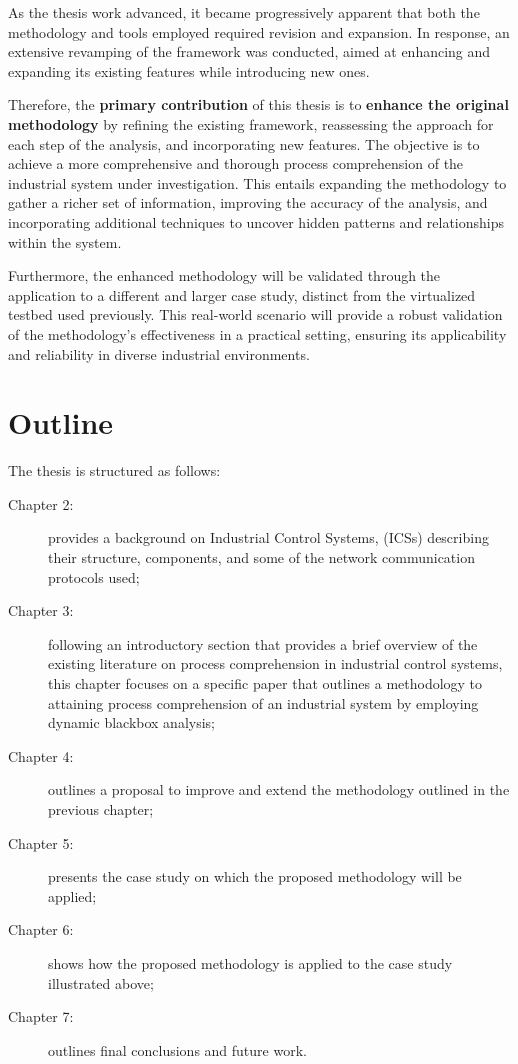 As the thesis work advanced, it became progressively apparent that both the methodology and tools employed required revision and expansion. In response, an extensive revamping of the framework was conducted, aimed at enhancing and expanding its existing features while introducing new ones.

\bigskip
Therefore, the \textbf{primary contribution} of this thesis is to \textbf{enhance the original methodology} by refining the existing framework, reassessing the approach for each step of the analysis, and incorporating new features. The objective is to achieve a more comprehensive and thorough process comprehension of the industrial system under investigation. This entails expanding the methodology to gather a richer set of information, improving the accuracy of the analysis, and incorporating additional techniques to uncover hidden patterns and relationships within the system.

\bigskip
Furthermore, the enhanced methodology will be validated through the application to a different and larger case study, distinct from the virtualized testbed used previously. This real-world scenario will provide a robust validation of the methodology's effectiveness in a practical setting, ensuring its applicability and reliability in diverse industrial environments. 

\section{Outline}
\label{sec:1_outline}
\noindent The thesis is structured as follows:

\begin{description}
	\item [Chapter 2:] provides a background on Industrial Control Systems, (ICSs) describing their structure, components, and some of the network communication protocols used;
	\item [Chapter 3:] following an introductory section that provides a brief overview of the existing literature on process comprehension in industrial control systems, this chapter focuses on a specific paper that outlines a methodology to attaining process comprehension of an industrial system by employing dynamic blackbox analysis;
	\item [Chapter 4:] outlines a proposal to improve and extend the methodology outlined in the previous chapter;
	\item [Chapter 5:] presents the case study on which the proposed methodology will be applied;
	\item [Chapter 6:] shows how the proposed methodology is applied to the case study illustrated above;
	\item [Chapter 7:] outlines final conclusions and future work.
\end{description}

\vfill
\nolinenumbers